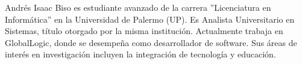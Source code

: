 \begin{IEEEbiography}
    {Andrés Isaac Biso} es estudiante avanzado de la carrera ''Licenciatura en
    Informática'' en la Universidad de Palermo (UP).
    Es Analista Universitario en Sistemas, título otorgado por la misma institución.
    Actualmente trabaja en GlobalLogic, donde se desempeña como desarrollador de software.
    Sus áreas de interés en investigación incluyen la integración de tecnología y educación.
\end{IEEEbiography}
